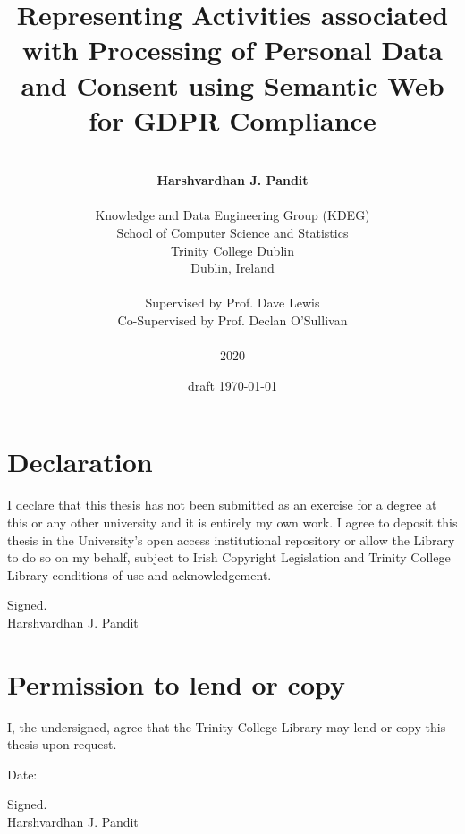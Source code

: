 \documentclass[a4paper,oneside,openright]{book}
\title{\Huge \textbf{Representing Activities associated with Processing of Personal Data and Consent using Semantic Web for GDPR Compliance}}
\date{draft \today}
\author{
    \vspace{3.5cm} \\
    \Large \textbf{Harshvardhan J. Pandit} \\
    \vspace{0.5cm} \\
    Knowledge and Data Engineering Group (KDEG) \\
    School of Computer Science and Statistics \\
    Trinity College Dublin \\
    Dublin, Ireland \\
    \vspace{2cm} \\
    Supervised by Prof. Dave Lewis \\
    Co-Supervised by Prof. Declan O'Sullivan \\
    \vspace{2cm} \\
    2020
 }
\begin{document}
\maketitle


\newpage
{}
\setcounter{page}{2}
\pagestyle{plain}
\chapter*{Declaration}
\Large
I declare that this thesis has not been submitted as an exercise for a degree at this or any other university and it is entirely my own work. I agree to deposit this thesis in the University’s open access institutional repository or allow the Library to do so on my behalf, subject to Irish Copyright Legislation and Trinity College Library conditions of use and acknowledgement.

\vspace{3cm}
\noindent
Signed. \\
Harshvardhan J. Pandit

\chapter*{Permission to lend or copy}
I, the undersigned, agree that the Trinity College Library may lend or copy this thesis upon request.

\vspace{3cm}\noindent
Date:

\vspace{1cm}\noindent
Signed. \\
Harshvardhan J. Pandit

\normalsize



\tableofcontents
\listoffigures
\listoftables


\renewcommand{\thepage}{\arabic{page}}
\setcounter{page}{1}

% 
% 
% 
% 
% 
% 


\end{document}
